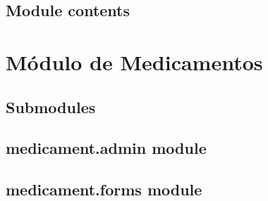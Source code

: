 \documentclass[letterpaper,10pt,spanish]{sphinxmanual}
\begin{document}

\begin{fulllineitems}
\label{ganados:ganados.views.verify_attempt}
\end{fulllineitems}



\subsection{Module contents}
\label{ganados:module-ganados}\label{ganados:module-contents}

\section{Módulo de Medicamentos}
\label{medicament::doc}\label{medicament:medicament-package}

\subsection{Submodules}
\label{medicament:submodules}

\subsection{medicament.admin module}
\label{medicament:module-medicament.admin}\label{medicament:medicament-admin-module}

\subsection{medicament.forms module}
\label{medicament:module-medicament.forms}\label{medicament:medicament-forms-module}
\end{document}
